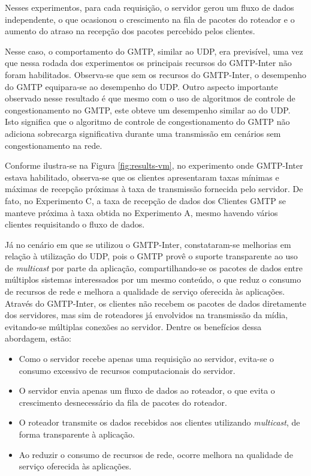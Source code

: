 Nesses experimentos, para cada requisição, o servidor gerou um fluxo de dados independente, o que ocasionou o crescimento na fila de pacotes do roteador e o aumento do atraso na recepção dos pacotes percebido pelos clientes. 

Nesse caso, o comportamento do GMTP, similar ao UDP, era previsível, uma vez que nessa rodada dos experimentos os principais recursos do GMTP-Inter não foram habilitados.
Observa-se que sem os recursos do GMTP-Inter, o desempenho do GMTP equipara-se ao desempenho do UDP. 
Outro aspecto importante observado nesse resultado é que mesmo com o uso de algoritmos de controle de congestionamento no GMTP, este obteve um desempenho similar ao do UDP.
Isto significa que o algoritmo de controle de congestionamento do GMTP não adiciona sobrecarga significativa durante uma transmissão em cenários sem congestionamento na rede.

Conforme ilustra-se na Figura \ref{fig:results-vm}, no experimento onde GMTP-Inter estava habilitado, observa-se que os clientes apresentaram taxas mínimas e máximas de recepção próximas à taxa de transmissão fornecida pelo servidor. De fato, no Experimento C, a taxa de recepção de dados dos Clientes GMTP se manteve próxima à taxa obtida no Experimento A, mesmo havendo vários clientes requisitando o fluxo de dados. 

Já no cenário em que se utilizou o GMTP-Inter, constataram-se melhorias em relação à utilização do UDP, pois o GMTP provê o suporte transparente ao uso de \textit{multicast} por parte da aplicação, compartilhando-se os pacotes de dados entre múltiplos sistemas interessados por um mesmo conteúdo, o que reduz o consumo de recursos de rede e melhora a qualidade de serviço oferecida às aplicações.
Através do GMTP-Inter, os clientes não recebem os pacotes de dados diretamente dos servidores, mas sim de roteadores já envolvidos na transmissão da mídia, evitando-se múltiplas conexões ao servidor. 
Dentre os benefícios dessa abordagem, estão:
\begin{itemize}
\item Como o servidor recebe apenas uma requisição ao servidor, evita-se o consumo excessivo de recursos computacionais do servidor.
\item O servidor envia apenas um fluxo de dados ao roteador, o que evita o crescimento desnecessário da fila de pacotes do roteador. 
\item O roteador transmite os dados recebidos aos clientes utilizando \textit{multicast}, de forma transparente à aplicação.
\item Ao reduzir o consumo de recursos de rede, ocorre melhora na qualidade de serviço oferecida às aplicações.
\end{itemize}

